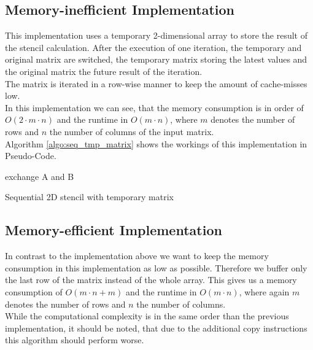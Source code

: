 \documentclass[11pt,a4paper]{article}
\begin{document}
\subsection{Memory-inefficient Implementation}
This implementation uses a temporary 2-dimensional array to store the result of the stencil calculation. After the execution of one iteration, the temporary and original matrix are switched, the temporary matrix storing the latest values and the original matrix the future result of the iteration.\\
The matrix is iterated in a row-wise manner to keep the amount of cache-misses low.\\
In this implementation we can see, that the memory consumption is in order of $O(2 \cdot m \cdot n)$ and the runtime in $O(m \cdot n)$, where $m$ denotes the number of rows and $n$ the number of columns of the input matrix.\\
Algorithm \ref{algo:seq_tmp_matrix} shows the workings of this implementation in Pseudo-Code.

\begin{algorithm}[H] \label{algo:seq_tmp_matrix}
 
  {
  exchange A and B
 }
 \caption{Sequential 2D stencil with temporary matrix}
\end{algorithm}

\subsection{Memory-efficient Implementation} \label{subsec:seq2}
In contrast to the implementation above we want to keep the memory consumption in this implementation as low as possible. Therefore we buffer only the last row of the matrix instead of the whole array. This gives us a memory consumption of $O(m \cdot n + m)$ and the runtime in $O(m \cdot n)$, where again $m$ denotes the number of rows and $n$ the number of columns.\\
While the computational complexity is in the same order than the previous implementation, it should be noted, that due to the additional copy instructions this algorithm should perform worse.\\
\end{document}
